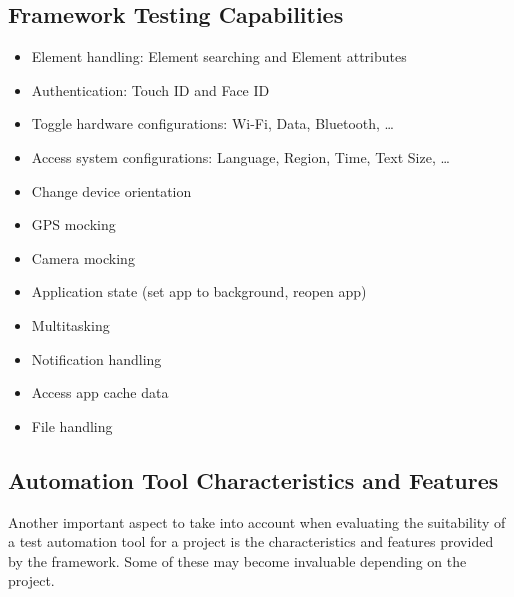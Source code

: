 \subsection {Framework Testing Capabilities}
	\begin{itemize}
  		\vspace{-0.4cm}\item Element handling: Element searching and Element attributes
		\vspace{-0.4cm}\item Authentication: Touch ID and Face ID
		\vspace{-0.4cm}\item Toggle hardware configurations: Wi-Fi, Data, Bluetooth, …
		\vspace{-0.4cm}\item Access system configurations: Language, Region, Time, Text Size, …
		\vspace{-0.4cm}\item Change device orientation
		\vspace{-0.4cm}\item GPS mocking
		\vspace{-0.4cm}\item Camera mocking
		\vspace{-0.4cm}\item Application state (set app to background, reopen app)
		\vspace{-0.4cm}\item Multitasking
		\vspace{-0.4cm}\item Notification handling
		\vspace{-0.4cm}\item Access app cache  data
		\vspace{-0.4cm}\item File handling
	\end{itemize}
	
\subsection {Automation Tool Characteristics and Features}

Another important aspect to take into account when evaluating the suitability of a test automation tool for a project is the characteristics and features provided by the framework. Some of these may become invaluable depending on the project. 


